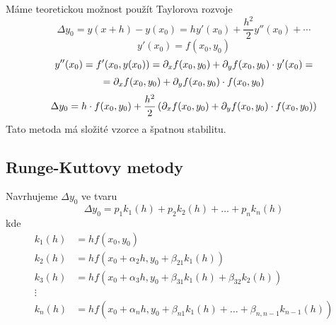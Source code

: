 	Máme teoretickou možnost použít Taylorova rozvoje
	$$ \Delta y_0 = y(x+h) - y(x_0) = hy'(x_0) + \frac{h^2}{2}y''(x_0) + \dotsb$$
	$$ y'(x_0) = f(x_0,y_0)$$
	$$ y''(x_0) = f'(x_0,y(x_0)) = \partial_x f(x_0,y_0) + \partial_y f(x_0,y_0)\cdot y'(x_0)=$$
	$$ = \partial_x f(x_0,y_0) + \partial_y f(x_0,y_0)\cdot f(x_0,y_0)$$
	$$ \Delta y_0 = h \cdot f(x_0,y_0) + \frac{h^2}{2}\left( \partial_x f(x_0,y_0) + \partial_y f(x_0,y_0)
	\cdot f(x_0,y_0) \right)$$
	Tato metoda má složité vzorce a špatnou stabilitu.
	
	\subsection{Runge-Kuttovy metody}
	
	Navrhujeme $\Delta y_0$ ve tvaru
	$$\Delta y_0 = p_1 k_1 (h) + p_2 k_2 (h) + \dots + p_n k_n (h)$$
	kde
	\vspace{-1ex}
	\begin{align*}
		k_1 (h) &= h f(x_0,y_0) \\
		k_2 (h) &= h f(x_0 + \alpha_2 h,y_0 + \beta_{21} k_1 (h)) \\
		k_3 (h) &= h f(x_0 + \alpha_3 h,y_0 + \beta_{31} k_1 (h) + \beta_{32} k_2 (h)) \\
		\vdots \\
		k_n (h) &= h f(x_0 + \alpha_n h,y_0 + \beta_{n1} k_1 (h) + \dots + \beta_{n,n-1}
		k_{n-1} (h))
	\end{align*}
	

